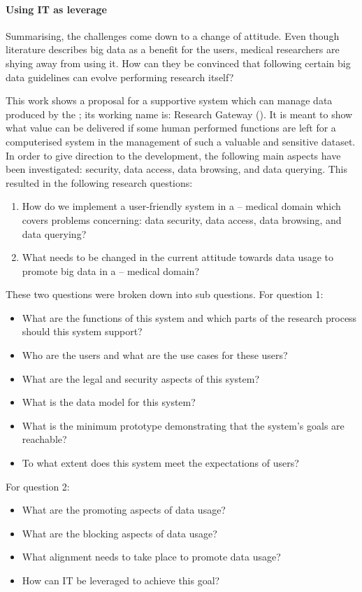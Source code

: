 \paragraph{Using IT as leverage}
Summarising, the challenges come down to a change of attitude.
Even though literature describes big data as a benefit for the users, medical researchers are shying away from using it.
How can they be convinced that following certain big data guidelines can evolve performing research itself?

This work shows a proposal for a supportive system which can manage data produced by the \project{}; its working name is: \project{} Research Gateway (\ivfsystem{}).
It is meant to show what value can be delivered if some human performed functions are left for a computerised system in the management of such a valuable and sensitive dataset.
In order to give direction to the development, the following main aspects have been investigated: security, data access, data browsing, and data querying.
This resulted in the following research questions:

\begin{enumerate}
	\item How do we implement a user-friendly system in a \IVF{}--\PRN{} medical domain which covers problems concerning: data security, data access, data browsing, and data querying?
	\item What needs to be changed in the current attitude towards data usage to promote big data in a \IVF{}--\PRN{} medical domain?
\end{enumerate}

These two questions were broken down into sub questions. 
For question 1:
\begin{itemize}
	\item What are the functions of this system and which parts of the research process should this system support?
	\item Who are the users and what are the use cases for these users?
	\item What are the legal and security aspects of this system?
	\item What is the data model for this system?
	\item What is the minimum prototype demonstrating that the system's goals are reachable?
	\item To what extent does this system meet the expectations of users?
\end{itemize}

For question 2:
\begin{itemize}
	\item What are the promoting aspects of data usage?
	\item What are the blocking aspects of data usage?
	\item What alignment needs to take place to promote data usage?
	\item How can IT be leveraged to achieve this goal?
\end{itemize}